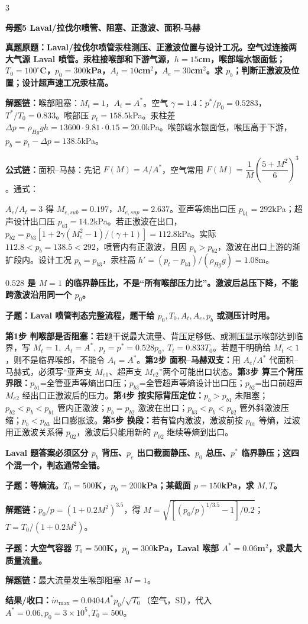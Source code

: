 \documentclass[a4paper]{article}
\newcommand{\mt}[1]{\vspace{0.22pt}\colorbox{M}{\parbox{\dimexpr\linewidth-2\fboxsep}{\color{white}\bfseries #1}}\par}
\newcommand{\qt}[1]{\vspace{0.10pt}\colorbox{Q}{\parbox{\dimexpr\linewidth-2\fboxsep}{\color{white}\bfseries #1}}\par}
\newcommand{\ans}[1]{\colorbox{G}{\parbox{\dimexpr\linewidth-2\fboxsep}{#1}}\par}
\newcommand{\warn}[1]{\colorbox{Y}{\parbox{\dimexpr\linewidth-2\fboxsep}{\color{E}\bfseries #1}}\par}
\newcommand{\chain}[1]{{\color{A}\bfseries 解题链：}#1\par}
\newcommand{\res}[1]{{\color{E}\bfseries 结果/收口：}#1\par}
\newcommand{\form}[1]{{\color{M}\bfseries 公式链：}#1\par}
\newenvironment{vfourWrap}{\par\begingroup\fontsize{2.66}{2.80}\selectfont\setlength{\fboxsep}{0.38pt}}{\par\endgroup}
\begin{document}
\begin{multicols}{3}
\begin{vfourWrap}
\end{vfourWrap}
\mt{母题5 Laval/拉伐尔喷管、阻塞、正激波、面积-马赫}
\qt{真题原题：Laval/拉伐尔喷管汞柱测压、正激波位置与设计工况。空气过连接两大气源 Laval 喷管。汞柱接喉部和下游气源，$h=15$cm，喉部端水银面低；$T_0=100^\circ$C，$p_0=300$kPa，$A_t=10$cm$^2$，$A_e=30$cm$^2$。求 $p_b$；判断正激波及位置；设计超声速工况汞柱高。}
\chain{喉部阻塞：$M_t=1$，$A_t=A^*$。空气 $\gamma=1.4$：$p^*/p_0=0.5283$，$T^*/T_0=0.833$。喉部压 $p_t=158.5$kPa。汞柱差 $\Delta p=\rho_{Hg}gh=13600\cdot9.81\cdot0.15=20.0$kPa。喉部端水银面低，喉压高于下游，$p_b=p_t-\Delta p=138.5$kPa。}
\form{面积--马赫：先记 $F(M)=A/A^*$，空气常用 $F(M)=\dfrac1M\left(\dfrac{5+M^2}{6}\right)^3$。通式：}
\ans{\resizebox{0.94\linewidth}{!}{$\displaystyle F(M)=\frac{A}{A^*}=\frac1M\left[\frac{2}{\gamma+1}\left(1+\frac{\gamma-1}{2}M^2\right)\right]^{\frac{\gamma+1}{2(\gamma-1)}}$}}
\ans{$A_e/A_t=3$ 得 $M_{e,sub}=0.197$，$M_{e,sup}=2.637$。亚声等熵出口压 $p_{b1}=292$kPa；超声设计出口压 $p_{b3}=14.2$kPa。若正激波在出口，$p_{b2}=p_{b3}[1+2\gamma(M_e^2-1)/(\gamma+1)]=112.8$kPa。实际 $112.8<p_b=138.5<292$，喷管内有正激波，且因 $p_b>p_{b2}$，激波在出口上游的渐扩段内。设计工况 $p_b=p_{b3}$，汞柱高 $h'=(p_t-p_{b3})/(\rho_{Hg}g)=1.08$m。}
\warn{$0.528$ 是 $M=1$ 的临界静压比，不是“所有喉部压力比”。激波后总压下降，不能跨激波沿用同一个 $p_0$。}

\qt{子题：Laval 喷管判态完整流程，题干给 $p_0,T_0,A_t,A_e,p_b$ 或测压计时用。}
\ans{\textbf{第1步 判喉部是否阻塞：}若题干说最大流量、背压足够低、或测压显示喉部达到临界，写 $M_t=1,\ A_t=A^*,\ p_t=p^*=0.528p_0,\ T_t=0.833T_0$。若题干明确给 $M_t<1$，则不是临界喉部，不能令 $A_t=A^*$。\textbf{第2步 面积--马赫双支：}用 $A_e/A^*$ 代面积--马赫式，必须写“亚声支 $M_{e1}$、超声支 $M_{e2}$”两个可能出口状态。\textbf{第3步 算三个背压界限：}$p_{b1}$=全管亚声等熵出口压；$p_{b3}$=全管超声等熵设计出口压；$p_{b2}$=出口前超声 $M_{e2}$ 经出口正激波后的压力。\textbf{第4步 按实际背压定位：}$p_b>p_{b1}$ 未阻塞；$p_{b2}<p_b<p_{b1}$ 管内正激波；$p_b=p_{b2}$ 激波在出口；$p_{b3}<p_b<p_{b2}$ 管外斜激波压缩；$p_b<p_{b3}$ 出口膨胀波。\textbf{第5步 换段：}若有管内激波，激波前按 $p_{01}$ 等熵，过波用正激波关系得 $p_{02}$，激波后只能用新的 $p_{02}$ 继续等熵到出口。}
\warn{Laval 题答案必须区分 $p_b$ 背压、$p_e$ 出口截面静压、$p_0$ 总压、$p^*$ 临界静压；这四个混一个，判态通常全错。}

\qt{子题：等熵流。$T_0=500$K，$p_0=200$kPa；某截面 $p=150$kPa，求 $M,T$。}
\chain{$p_0/p=(1+0.2M^2)^{3.5}$，得 $M=\sqrt{[(p_0/p)^{1/3.5}-1]/0.2}$；$T=T_0/(1+0.2M^2)$。}

\qt{子题：大空气容器 $T_0=500$K，$p_0=300$kPa，Laval 喉部 $A^*=0.06$m$^2$，求最大质量流量。}
\chain{最大流量发生喉部阻塞 $M=1$。}
\res{$\dot m_{\max}=0.0404 A^*p_0/\sqrt{T_0}$（空气，SI），代入 $A^*=0.06,p_0=3\times10^5,T_0=500$。}


\end{multicols}
\end{document}
